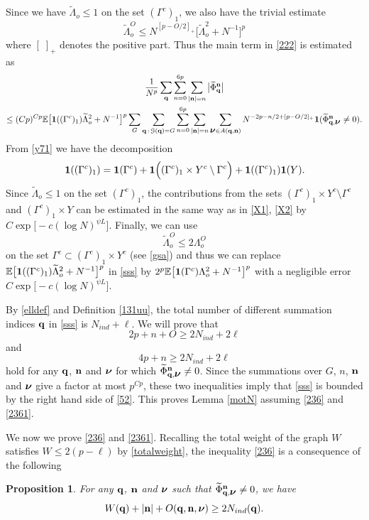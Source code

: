 \documentclass[draft]{article}
\newcommand{\wt}{\widetilde}
\newcommand{\bq}{{\bf {q}}}
\newcommand{\bn}{{\bf{n}}}
\newcommand{\bnu}{\mbox{\boldmath $\nu$}}
\newcommand{\be}{\begin{equation}}
\newcommand{\ee}{\end{equation}}
\newcommand{\cG}{{\mathcal G}}
\newcommand{\E}{{\mathbb E }}
\newtheorem{proposition}[theorem]{Proposition}
\numberwithin{equation}{section}
\numberwithin{theorem}{section}
\numberwithin{definition}{section}
\numberwithin{remark}{section}
\begin{document}
Since we have $\tilde \Lambda_o\le 1$ on the set $(\Gamma^c)_1$, we also  
 have  the trivial estimate
$$
\wt  \Lambda_o^O \le N^{[p - O/2]_+}\big[\wt \Lambda_o^{2} + N^{-1}\big]^p
$$
where $[\;]_+$ denotes the positive part. 
Thus the main term in \eqref{222}
is estimated as  
\begin{multline}\label{sss}
 \frac{ 1 }{N^p}  \sum_{\bq}    \sum_{n=0}^{6p}  \sum_{ |{\bf n} | =n} 
\big| \wt \Phi_{\bq}^{\bf n} \big|  \\
\le  (Cp)^{Cp} \E\big[
{\bf 1}((\Gamma^c)_1)  \wt \Lambda_o^{2} + N^{-1}\big]^p 
\sum_G\sum_{\bq\, : \, \cG(\bq)=G}
 \sum_{n=0}^{6p}  \sum_{ |{\bf n} | =n}  \sum_{\bnu\in A(\bq,\bn)}
  N^{-2p-n/2+ [p-O/2]_+} 
{\bf 1}( \wt \Phi_{\bq,\bnu}^{\bf n}
\ne 0). 
\end{multline}
From \eqref{y71} we have the decomposition 
\be\label{y72}
 {\bf 1} ((\Gamma^c)_1) =  {\bf 1} (\Gamma^c) +
  {\bf 1} \Big( (\Gamma^c)_1 \times Y^c  \setminus \Gamma^c \Big)
  +  {\bf 1} ((\Gamma^c)_1){\bf 1}( Y).
\ee
Since $\wt\Lambda_o\le 1$ on the set $(\Gamma^c)_1$, the
 contributions from the sets $(\Gamma^c)_1 \times Y^c  \setminus \Gamma^c$ 
and  $(\Gamma^c)_1\times  Y$ can be estimated in the same way as in  \eqref{X1}, \eqref{X2}
 by  $C\exp{\big[-c(\log N)^{\psi L } \big]}$. Finally, we can use 
\[
\wt \Lambda_o^O \le 2  \Lambda_o^O
\]
on the set $\Gamma^c \subset (\Gamma^c)_1 \times Y^c$ (see \eqref{gsa})
and thus we can replace $ \E\big[
{\bf 1}((\Gamma^c)_1)  \wt \Lambda_o^{2} + N^{-1}\big]^p $ in \eqref{sss} by $ 2^p \E\big[
{\bf 1}( \Gamma^c)  \Lambda_o^{2} + N^{-1}\big]^p$ with a  negligible error
 $C\exp{\big[-c(\log N)^{\psi L } \big]}$.

By \eqref{elldef} and Definition \ref{131uu}, the total number of different 
summation indices $\bq$ in \eqref{sss} is 
$N_{ind} + \ell$. 
We will prove that
\be\label{236}
 2p+ n +  O \ge  2 N_{ind}+ 2\ell 
\ee
and
\be\label{2361}
  4p+ n \ge  2 N_{ind}+ 2\ell
\ee
hold for any $\bq$, $\bn$ and $\bnu$ for which 
$\wt \Phi_{\bq,\bnu}^{\bf n}\ne 0$.
Since the summations over $G$, $n$, $\bn$ and $\bnu$ give a factor
at most $p^{ C p}$,  
 these two inequalities imply that 
\eqref{sss} is bounded by the right hand side of \eqref{52}. This  proves Lemma \ref{motN}
assuming \eqref{236} and \eqref {2361}. 

\medskip

We  now we prove \eqref{236} and \eqref {2361}.  Recalling  the total weight
 of the graph $W$ satisfies
$W \le 2(p-\ell)$ by \eqref{totalweight},
 the inequality \eqref{236} is a consequence of the following
\begin{proposition}\label{prop:powercount}
 For any $\bq$, $\bn$ and $\bnu$ such that $\wt\Phi_{\bq,\bnu}^{\bf n}\ne 0$, 
we have
\be\label{237}
W (\bq) +  |\bn| +    O (\bq, \bn, \bnu) \ge  2   N_{ind}(\bq).
\ee
\end{proposition}
\end{document}
